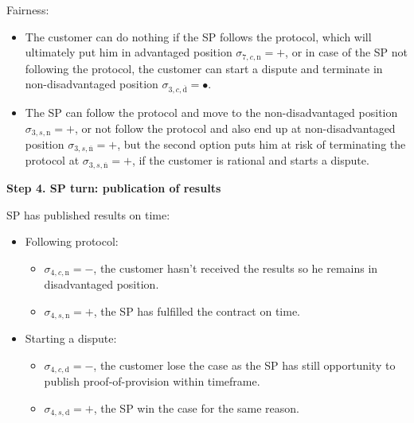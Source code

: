 \documentclass{ieeeaccess}
\begin{document}
Fairness:

\begin{itemize}

\item
  The customer can do nothing if the SP follows the protocol, which will
  ultimately put him in advantaged position
  \(\sigma_{7, c, \mathrm{n}} = +\), or in case of the SP not following
  the protocol, the customer can start a dispute and terminate in
  non-disadvantaged position
  \(\sigma_{3, c, \overline{\mathrm{d}}} = •\).
\item
  The SP can follow the protocol and move to the non-disadvantaged
  position \(\sigma_{3, s, \mathrm{n}} = +\), or not follow the protocol
  and also end up at non-disadvantaged position
  \(\sigma_{3, s, \overline{\mathrm{n}}} = +\), but the second option
  puts him at risk of terminating the protocol at
  \(\sigma_{3, s, \overline{\mathrm{n}}} = +\), if the customer is
  rational and starts a dispute.
\end{itemize}

\noindent \textbf
{Step 4. SP turn: publication of results}\label{step-4-publication-of-results}

SP has published results on time:

\begin{itemize}
\item
  Following protocol:

  \begin{itemize}
  
  \item
    \(\sigma_{4, c, \mathrm{n}} = -\), the customer hasn't received the results so he remains in disadvantaged position.
  \item
    \(\sigma_{4, s, \mathrm{n}} = +\), the SP has fulfilled the contract on time.
  \end{itemize}
\item
  Starting a dispute:

  \begin{itemize}
  
  \item
    \(\sigma_{4, c, \mathrm{d}} = -\), the customer lose the case as the
    SP has still opportunity to publish proof-of-provision within
    timeframe.
  \item
    \(\sigma_{4, s, \mathrm{d}} = +\), the SP win the case for the same
    reason.
  \end{itemize}
\end{itemize}
\end{document}
